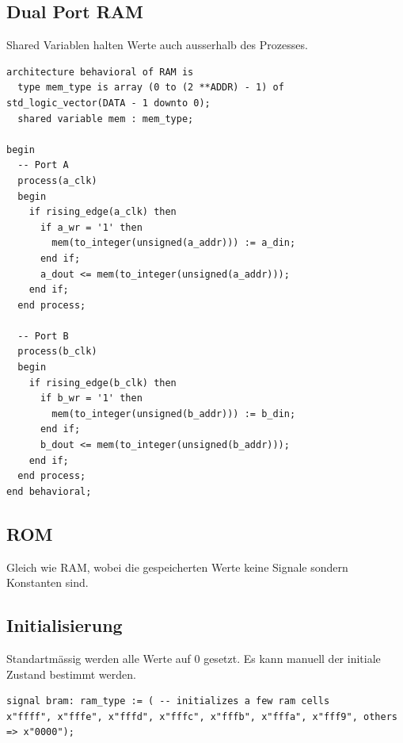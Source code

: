 \subsection{Dual Port RAM}
Shared Variablen halten Werte auch ausserhalb des Prozesses.
\begin{lstlisting}
architecture behavioral of RAM is
  type mem_type is array (0 to (2 **ADDR) - 1) of std_logic_vector(DATA - 1 downto 0);
  shared variable mem : mem_type;
	
begin
  -- Port A
  process(a_clk) 
  begin
    if rising_edge(a_clk) then
      if a_wr = '1' then
        mem(to_integer(unsigned(a_addr))) := a_din;
      end if;
      a_dout <= mem(to_integer(unsigned(a_addr)));
    end if;
  end process;

  -- Port B
  process(b_clk) 
  begin
    if rising_edge(b_clk) then
      if b_wr = '1' then
        mem(to_integer(unsigned(b_addr))) := b_din;
      end if;
      b_dout <= mem(to_integer(unsigned(b_addr)));
    end if;
  end process;
end behavioral;
\end{lstlisting}

\subsection{ROM}
Gleich wie RAM, wobei die gespeicherten Werte keine Signale sondern Konstanten sind.

\subsection{Initialisierung}
Standartmässig werden alle Werte auf 0 gesetzt. Es kann manuell der initiale Zustand bestimmt werden.
\begin{lstlisting}
signal bram: ram_type := ( -- initializes a few ram cells
x"ffff", x"fffe", x"fffd", x"fffc", x"fffb", x"fffa", x"fff9", others => x"0000");
\end{lstlisting}


